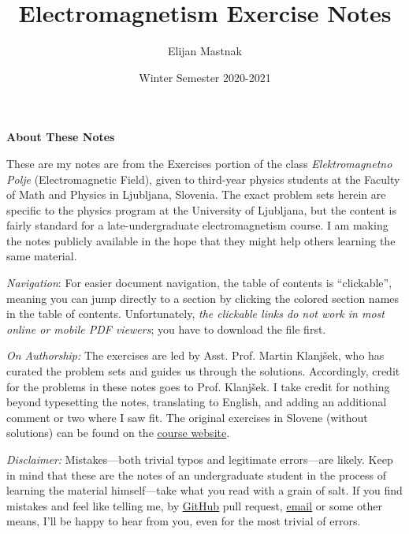 \documentclass[11pt, a4paper]{article}
\begin{document}
\title{Electromagnetism Exercise Notes}
\author{Elijan Mastnak}
\date{Winter Semester 2020-2021}
\maketitle

\begin{center}
\textbf{About These Notes}
\end{center}
These are my notes are from the Exercises portion of the class \textit{Elektromagnetno Polje} (Electromagnetic Field), given to third-year physics students at the Faculty of Math and Physics in Ljubljana, Slovenia. The exact problem sets herein are specific to the physics program at the University of Ljubljana, but the content is fairly standard for a late-undergraduate electromagnetism course. I am making the notes publicly available in the hope that they might help others learning the same material.

\vspace{2mm}
\textit{Navigation}: For easier document navigation, the table of contents is ``clickable'', meaning you can jump directly to a section by clicking the colored section names in the table of contents. Unfortunately, \textit{the clickable links do not work in most online or mobile PDF viewers}; you have to download the file first.

\vspace{2mm}
\textit{On Authorship:} 
The exercises are led by Asst. Prof. Martin Klanj\v{s}ek, who has curated the problem sets and guides us through the solutions. Accordingly, credit for the problems in these notes goes to Prof. Klanj\v{s}ek. I take credit for nothing beyond typesetting the notes, translating to English, and adding an additional comment or two where I saw fit. The original exercises in Slovene (without solutions) can be found on the \href{https://www-f5.ijs.si/emp-2020-2021.html}{\underline{course website}}. 

\vspace{2mm}
\textit{Disclaimer:} Mistakes---both trivial typos and legitimate errors---are likely. Keep in mind that these are the notes of an undergraduate student in the process of learning the material himself---take what you read with a grain of salt. If you find mistakes and feel like telling me, by \href{https://github.com/ejmastnak/fmf}{\underline{GitHub}} pull request, \href{mailto:ejmastnak@gmail.com}{\underline{email}} or some other means, I'll be happy to hear from you, even for the most trivial of errors.
\end{document}
